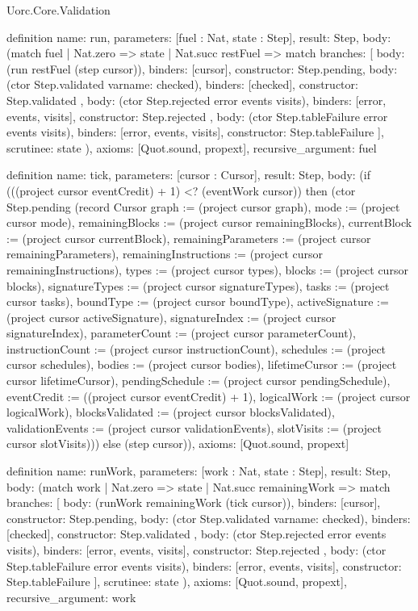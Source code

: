 \begin{lexlean}{Uorc.Core.Validation}
\begin{semanticmodule}
definition{
  name: run,
  parameters: [fuel : Nat, state : Step],
  result: Step,
  body: (match fuel
    | Nat.zero => state
    | Nat.succ restFuel => match{
      branches: [
        {body: (run restFuel (step cursor)), binders: [cursor], constructor: Step.pending},
        {
          body: (ctor Step.validated var{name: checked}),
          binders: [checked],
          constructor: Step.validated
        },
        {
          body: (ctor Step.rejected error events visits),
          binders: [error, events, visits],
          constructor: Step.rejected
        },
        {
          body: (ctor Step.tableFailure error events visits),
          binders: [error, events, visits],
          constructor: Step.tableFailure
        }
      ],
      scrutinee: state
    }),
  axioms: [Quot.sound, propext],
  recursive_argument: fuel
}

definition{
  name: tick,
  parameters: [cursor : Cursor],
  result: Step,
  body: (if (((project cursor eventCredit) + 1) <? (eventWork cursor)) then (ctor Step.pending (record Cursor {graph := (project cursor graph), mode := (project cursor mode), remainingBlocks := (project cursor remainingBlocks), currentBlock := (project cursor currentBlock), remainingParameters := (project cursor remainingParameters), remainingInstructions := (project cursor remainingInstructions), types := (project cursor types), blocks := (project cursor blocks), signatureTypes := (project cursor signatureTypes), tasks := (project cursor tasks), boundType := (project cursor boundType), activeSignature := (project cursor activeSignature), signatureIndex := (project cursor signatureIndex), parameterCount := (project cursor parameterCount), instructionCount := (project cursor instructionCount), schedules := (project cursor schedules), bodies := (project cursor bodies), lifetimeCursor := (project cursor lifetimeCursor), pendingSchedule := (project cursor pendingSchedule), eventCredit := ((project cursor eventCredit) + 1), logicalWork := (project cursor logicalWork), blocksValidated := (project cursor blocksValidated), validationEvents := (project cursor validationEvents), slotVisits := (project cursor slotVisits)})) else (step cursor)),
  axioms: [Quot.sound, propext]
}

definition{
  name: runWork,
  parameters: [work : Nat, state : Step],
  result: Step,
  body: (match work
    | Nat.zero => state
    | Nat.succ remainingWork => match{
      branches: [
        {body: (runWork remainingWork (tick cursor)), binders: [cursor], constructor: Step.pending},
        {
          body: (ctor Step.validated var{name: checked}),
          binders: [checked],
          constructor: Step.validated
        },
        {
          body: (ctor Step.rejected error events visits),
          binders: [error, events, visits],
          constructor: Step.rejected
        },
        {
          body: (ctor Step.tableFailure error events visits),
          binders: [error, events, visits],
          constructor: Step.tableFailure
        }
      ],
      scrutinee: state
    }),
  axioms: [Quot.sound, propext],
  recursive_argument: work
}


\end{semanticmodule}
\end{lexlean}
